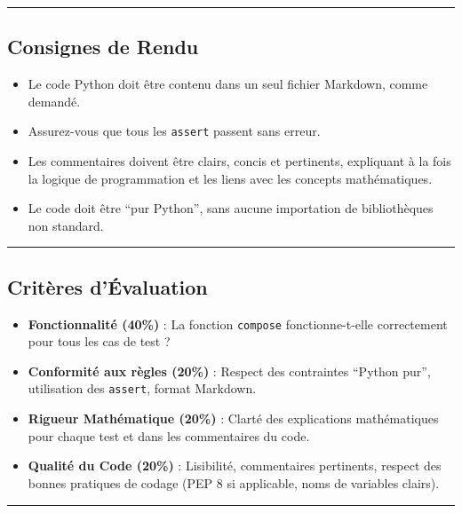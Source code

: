 \documentclass[12pt,a4paper]{report}
\newcommand{\passthrough}[1]{#1}
\providecommand{\tightlist}{%
  \setlength{\itemsep}{0pt}\setlength{\parskip}{0pt}}
\begin{document}
\begin{center}\rule{0.5\linewidth}{0.5pt}\end{center}

\subsection{Consignes de Rendu}\label{consignes-de-rendu}

\begin{itemize}
\tightlist
\item
  Le code Python doit être contenu dans un seul fichier Markdown, comme
  demandé.
\item
  Assurez-vous que tous les \passthrough{\lstinline!assert!} passent
  sans erreur.
\item
  Les commentaires doivent être clairs, concis et pertinents, expliquant
  à la fois la logique de programmation et les liens avec les concepts
  mathématiques.
\item
  Le code doit être ``pur Python'', sans aucune importation de
  bibliothèques non standard.
\end{itemize}

\begin{center}\rule{0.5\linewidth}{0.5pt}\end{center}

\subsection{Critères d'Évaluation}\label{crituxe8res-duxe9valuation}

\begin{itemize}
\tightlist
\item
  \textbf{Fonctionnalité (40\%)} : La fonction
  \passthrough{\lstinline!compose!} fonctionne-t-elle correctement pour
  tous les cas de test ?
\item
  \textbf{Conformité aux règles (20\%)} : Respect des contraintes
  ``Python pur'', utilisation des \passthrough{\lstinline!assert!},
  format Markdown.
\item
  \textbf{Rigueur Mathématique (20\%)} : Clarté des explications
  mathématiques pour chaque test et dans les commentaires du code.
\item
  \textbf{Qualité du Code (20\%)} : Lisibilité, commentaires pertinents,
  respect des bonnes pratiques de codage (PEP 8 si applicable, noms de
  variables clairs).
\end{itemize}

\begin{center}\rule{0.5\linewidth}{0.5pt}\end{center}
\newpage
\end{document}

